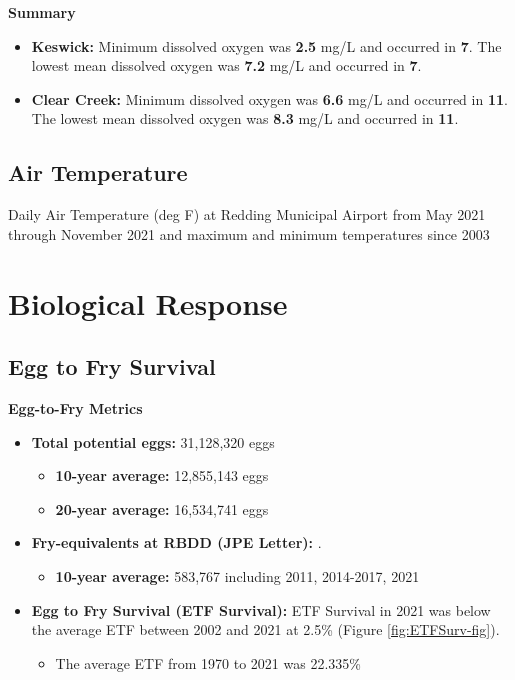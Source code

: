 \documentclass[
]{book}
\providecommand{\tightlist}{%
  \setlength{\itemsep}{0pt}\setlength{\parskip}{0pt}}
\theoremstyle{definition}
\theoremstyle{definition}
\theoremstyle{definition}
\theoremstyle{definition}
\theoremstyle{remark}
\begin{document}
\textbf{Summary}

\begin{itemize}
\tightlist
\item
  \textbf{Keswick:} Minimum dissolved oxygen was \textbf{2.5} mg/L and occurred in \textbf{7}. The lowest mean dissolved oxygen was \textbf{7.2} mg/L and occurred in \textbf{7}.
\item
  \textbf{Clear Creek:} Minimum dissolved oxygen was \textbf{6.6} mg/L and occurred in \textbf{11}. The lowest mean dissolved oxygen was \textbf{8.3} mg/L and occurred in \textbf{11}.
\end{itemize}

\hypertarget{air-temperature}{%
\subsection{Air Temperature}\label{air-temperature}}

\label{fig:KRDDatemp-fig}Daily Air Temperature (deg F) at Redding Municipal Airport from May 2021 through November 2021 and maximum and minimum temperatures since 2003

\hypertarget{biological-response-1}{%
\section{Biological Response}\label{biological-response-1}}

\hypertarget{egg-to-fry-survival}{%
\subsection{Egg to Fry Survival}\label{egg-to-fry-survival}}

\textbf{Egg-to-Fry Metrics}

\begin{itemize}
\tightlist
\item
  \textbf{Total potential eggs:} 31,128,320 eggs

  \begin{itemize}
  \tightlist
  \item
    \textbf{10-year average:} 12,855,143 eggs
  \item
    \textbf{20-year average:} 16,534,741 eggs
  \end{itemize}
\item
  \textbf{Fry-equivalents at RBDD (JPE Letter):} .

  \begin{itemize}
  \tightlist
  \item
    \textbf{10-year average:} 583,767 including 2011, 2014-2017, 2021
  \end{itemize}
\item
  \textbf{Egg to Fry Survival (ETF Survival):} ETF Survival in 2021 was below the average ETF between 2002 and 2021 at 2.5\% (Figure \ref{fig:ETFSurv-fig}).

  \begin{itemize}
  \tightlist
  \item
    The average ETF from 1970 to 2021 was 22.335\%
  \end{itemize}
\end{itemize}
\end{document}

